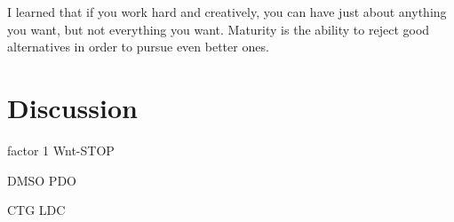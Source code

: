 \begin{savequote}[75mm]
I learned that if you work hard and creatively, you can have just about anything you want, but not everything you want. Maturity is the ability to reject good alternatives in order to pursue even better ones.

\end{savequote}

\chapter{Discussion}

factor 1
Wnt-STOP

\label{conclusion}

DMSO
PDO

CTG
LDC
